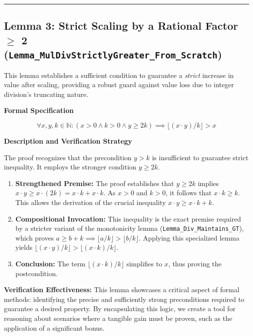 \documentclass[
  english,
  onecolumn]{article}
\providecommand{\tightlist}{%
  \setlength{\itemsep}{0pt}\setlength{\parskip}{0pt}}
\begin{document}
\begin{center}\rule{0.5\linewidth}{0.5pt}\end{center}

\subsection{\texorpdfstring{\textbf{Lemma 3: Strict Scaling by a
Rational Factor \(\geq\) 2
(\texttt{Lemma\_MulDivStrictlyGreater\_From\_Scratch})}}{Lemma 3: Strict Scaling by a Rational Factor \textbackslash geq 2 (Lemma\_MulDivStrictlyGreater\_From\_Scratch)}}\label{lemma-3-strict-scaling-by-a-rational-factor-geq-2-lemma_muldivstrictlygreater_from_scratch}

This lemma establishes a sufficient condition to guarantee a
\emph{strict} increase in value after scaling, providing a robust guard
against value loss due to integer division's truncating nature.

\textbf{Formal Specification}

\[
\forall x, y, k \in \mathbb{N} : (x > 0 \land k > 0 \land y \ge 2k) \implies \lfloor (x \cdot y) / k \rfloor > x
\]

\textbf{Description and Verification Strategy}

The proof recognizes that the precondition \(y > k\) is insufficient to
guarantee strict inequality. It employs the stronger condition
\(y \ge 2k\).

\begin{enumerate}
\def\labelenumi{\arabic{enumi}.}
\tightlist
\item
  \textbf{Strengthened Premise:} The proof establishes that \(y \ge 2k\)
  implies \(x \cdot y \ge x \cdot (2k) = x \cdot k + x \cdot k\). As
  \(x > 0\) and \(k > 0\), it follows that \(x \cdot k \ge k\). This
  allows the derivation of the crucial inequality
  \(x \cdot y \ge x \cdot k + k\).
\item
  \textbf{Compositional Invocation:} This inequality is the exact
  premise required by a stricter variant of the monotonicity lemma
  (\texttt{Lemma\_Div\_Maintains\_GT}), which proves
  \(a \ge b+k \implies \lfloor a/k \rfloor > \lfloor b/k \rfloor\).
  Applying this specialized lemma yields
  \(\lfloor(x \cdot y)/k\rfloor > \lfloor(x \cdot k)/k\rfloor\).
\item
  \textbf{Conclusion:} The term \(\lfloor(x \cdot k)/k\rfloor\)
  simplifies to \(x\), thus proving the postcondition.
\end{enumerate}

\textbf{Verification Effectiveness:} This lemma showcases a critical
aspect of formal methods: identifying the precise and sufficiently
strong preconditions required to guarantee a desired property. By
encapsulating this logic, we create a tool for reasoning about scenarios
where a tangible gain must be proven, such as the application of a
significant bonus.
\end{document}
